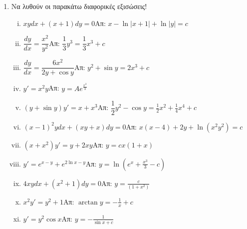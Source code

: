 \documentclass[a4paper,12pt]{article}
\begin{document}
\begin{center}
\end{center}

\vspace{1cm}

\begin{enumerate}
\item Να λυθούν οι παρακάτω διαφορικές εξισώσεις!
\begin{enumerate}[i.]
\item $xydx + (x+1)dy=0$\hfill Απ: $x-\ln|x+1|+\ln|y|=c$
\item $\dfrac{dy}{dx}=\dfrac{x^2}{y^2}$\hfill Απ: $\dfrac{1}{3}y^3=\dfrac{1}{3}x^3+c$
\item $\dfrac{dy}{dx}=\dfrac{6x^2}{2y+\cos y}$\hfill Απ: $y^2+\sin y = 2x^3 +c$
\item $y'=x^2y$\hfill Απ: $y=Ae^{\frac{x^3}{3}}$
\item $(y+\sin y)y'=x+x^3$\hfill Απ: $\dfrac{1}{2}y^2-\cos y = \frac{1}{2}x^2+\frac{1}{4}x^4+c$
\item $(x-1)^2ydx+(xy+x)dy=0$\hfill Απ: $x(x-4)+2y+\ln(x^2y^2)=c$
\item $(x+x^2)y'=y+2xy$\hfill Απ: $y=cx(1+x)$
\item $y'=e^{x-y}+e^{2\ln x-y}$\hfill Απ: $y=\ln(e^x+\frac{x^3}{3}-c)$
\item $4xydx+(x^2+1)dy=0$\hfill Απ: $y=\frac{c}{(1+x^2)}$
\item $x^2y'=y^2+1$\hfill Απ: $\arctan y = -\frac{1}{x}+c$
\item $y'=y^2\cos x$\hfill Απ: $y=-\frac{1}{\sin x +c }$
\end{enumerate}
\end{enumerate}
\end{document}
